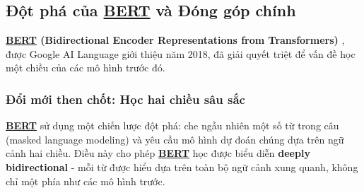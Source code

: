     \subsection{Đột phá của \hyperref[acro:bert]{\textbf{BERT}} và Đóng góp chính}
    \label{ssec:muc_tieu_dong_gop_bert}
    
    \textbf{\hyperref[acro:bert]{\textbf{BERT}} (Bidirectional Encoder Representations from Transformers)} \cite{devlin2018bert}, được Google AI Language giới thiệu năm 2018, đã giải quyết triệt để vấn đề học một chiều của các mô hình trước đó. 
    
    \subsubsection{Đổi mới then chốt: Học hai chiều sâu sắc}
    \hyperref[acro:bert]{\textbf{BERT}} sử dụng một chiến lược đột phá: che ngẫu nhiên một số từ trong câu (masked language modeling) và yêu cầu mô hình dự đoán chúng dựa trên ngữ cảnh hai chiều. Điều này cho phép \hyperref[acro:bert]{\textbf{BERT}} học được biểu diễn \textbf{deeply bidirectional} - mỗi từ được hiểu dựa trên toàn bộ ngữ cảnh xung quanh, không chỉ một phía như các mô hình trước.
    
